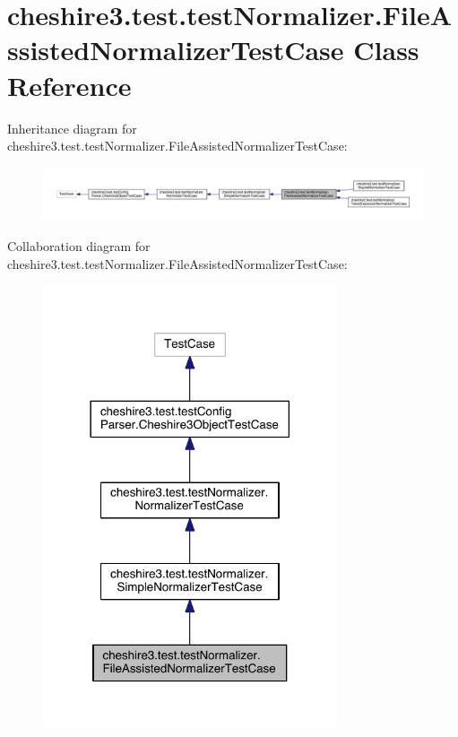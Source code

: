 \hypertarget{classcheshire3_1_1test_1_1test_normalizer_1_1_file_assisted_normalizer_test_case}{\section{cheshire3.\-test.\-test\-Normalizer.\-File\-Assisted\-Normalizer\-Test\-Case Class Reference}
\label{classcheshire3_1_1test_1_1test_normalizer_1_1_file_assisted_normalizer_test_case}
}


Inheritance diagram for cheshire3.\-test.\-test\-Normalizer.\-File\-Assisted\-Normalizer\-Test\-Case\-:
\nopagebreak
\begin{figure}[H]
\begin{center}
\leavevmode
\includegraphics[width=350pt]{classcheshire3_1_1test_1_1test_normalizer_1_1_file_assisted_normalizer_test_case__inherit__graph}
\end{center}
\end{figure}


Collaboration diagram for cheshire3.\-test.\-test\-Normalizer.\-File\-Assisted\-Normalizer\-Test\-Case\-:
\nopagebreak
\begin{figure}[H]
\begin{center}
\leavevmode
\includegraphics[width=246pt]{classcheshire3_1_1test_1_1test_normalizer_1_1_file_assisted_normalizer_test_case__coll__graph}
\end{center}
\end{figure}

